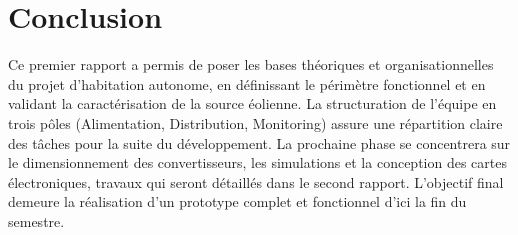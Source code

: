 \chapter*{Conclusion}

Ce premier rapport a permis de poser les bases théoriques et organisationnelles du projet d'habitation autonome, en définissant le périmètre fonctionnel et en validant la caractérisation de la source éolienne. La structuration de l’équipe en trois pôles (Alimentation, Distribution, Monitoring) assure une répartition claire des tâches pour la suite du développement. La prochaine phase se concentrera sur le dimensionnement des convertisseurs, les simulations et la conception des cartes électroniques, travaux qui seront détaillés dans le second rapport. L'objectif final demeure la réalisation d'un prototype complet et fonctionnel d'ici la fin du semestre.
